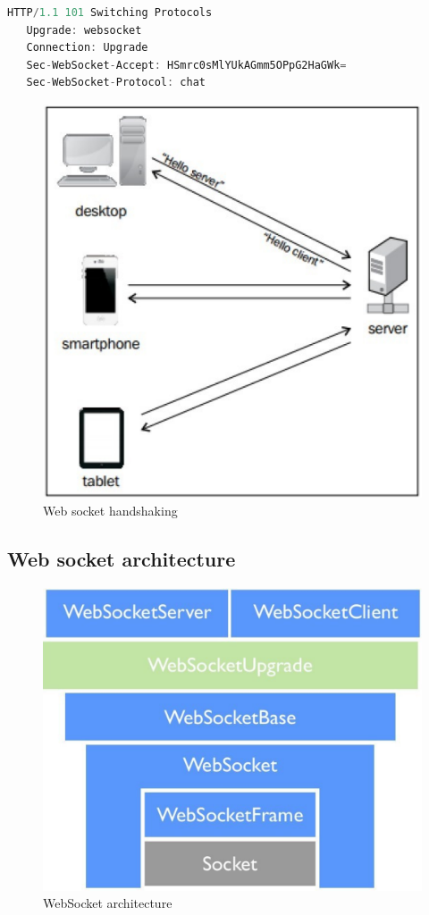 \documentclass[a4paper, 11pt]{report}
\begin{document}
\begin{lstlisting}[caption={Server's response for websocket handshake},captionpos=b, label={lst:serverHandshake}, language=c, float=h]
   HTTP/1.1 101 Switching Protocols
   Upgrade: websocket
   Connection: Upgrade
   Sec-WebSocket-Accept: HSmrc0sMlYUkAGmm5OPpG2HaGWk=
   Sec-WebSocket-Protocol: chat
\end{lstlisting}



	
\begin{figure}[h]
\centering
\includegraphics[scale=0.5]{images/server.pdf}
\caption{Web socket handshaking}\label{fig:WebSocketHandshaking}
\end{figure}


	\subsection{Web socket architecture}
	
	\begin{figure}[h]
	\centering
	\includegraphics[scale=0.3]{images/websocketsArchitecture.pdf}
	\caption{WebSocket architecture}\label{fig:WebSocketArchitecture}
	\end{figure}
	



\end{document}
